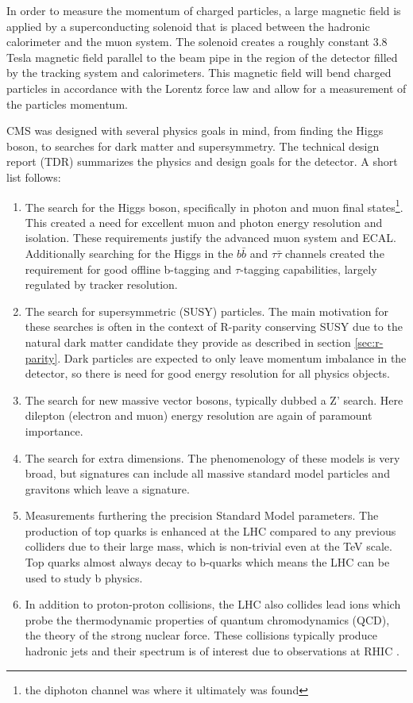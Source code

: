   In order to measure the momentum of charged particles, a large magnetic field is applied by a superconducting solenoid that is placed between the hadronic calorimeter and the muon system. The solenoid creates a roughly constant 3.8 Tesla magnetic field parallel to the beam pipe in the region of the detector filled by the tracking system and calorimeters. This magnetic field will bend charged particles in accordance with the Lorentz force law and allow for a measurement of the particles momentum.

  CMS was designed with several physics goals in mind, from finding the Higgs boson, to searches for dark matter and supersymmetry. The technical design report (TDR) \cite{cms_tdr} summarizes the physics and design goals for the detector. A short list follows:

  \begin{enumerate}
    \item The search for the Higgs boson, specifically in photon and muon final states\footnote{the diphoton channel was where it ultimately was found}. This created a need for excellent muon and photon energy resolution and isolation. These requirements justify the advanced muon system and ECAL. Additionally searching for the Higgs in the $b\bar{b}$ and $\tau \bar{\tau}$ channels created the requirement for good offline b-tagging and $\tau$-tagging capabilities, largely regulated by tracker resolution.
    \item The search for supersymmetric (SUSY) particles. The main motivation for these searches is often in the context of R-parity conserving SUSY due to the natural dark matter candidate they provide as described in section \ref{sec:r-parity}. Dark particles are expected to only leave momentum imbalance in the detector, so there is need for good energy resolution for all physics objects. 
    \item The search for new massive vector bosons, typically dubbed a Z' search. Here dilepton (electron and muon) energy resolution are again of paramount importance.
    \item The search for extra dimensions. The phenomenology of these models is very broad, but signatures can include all massive standard model particles and gravitons which leave a \MET signature.
    \item Measurements furthering the precision Standard Model parameters. The production of top quarks is enhanced at the LHC compared to any previous colliders due to their large mass, which is non-trivial even at the TeV scale. Top quarks almost always decay to b-quarks which means the LHC can be used to study b physics.
    \item In addition to proton-proton collisions, the LHC also collides lead ions which probe the thermodynamic properties of quantum chromodynamics (QCD), the theory of the strong nuclear force. These collisions typically produce hadronic jets and their \pt spectrum is of interest due to observations at RHIC \cite{QCD_collider_physics}.
  \end{enumerate}

